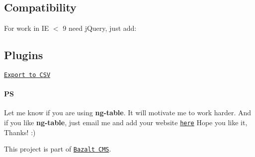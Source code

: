 \subsection*{Compatibility}

For work in IE $<$ 9 need j\+Query, just add\+: 
\begin{DoxyCode}
\end{DoxyCode}


\subsection*{Plugins}


\begin{DoxyItemize}
\item \href{https://github.com/esvit/ng-table-export}{\tt Export to C\+SV}
\end{DoxyItemize}

\paragraph*{PS}

Let me know if you are using {\bfseries ng-\/table}. It will motivate me to work harder. And if you like {\bfseries ng-\/table}, just email me and add your website \href{http://bazalt-cms.com/ng-table/who-is-using}{\tt here} Hope you like it, Thanks! \+:) 



This project is part of \href{http://bazalt-cms.com/}{\tt Bazalt C\+MS}. 